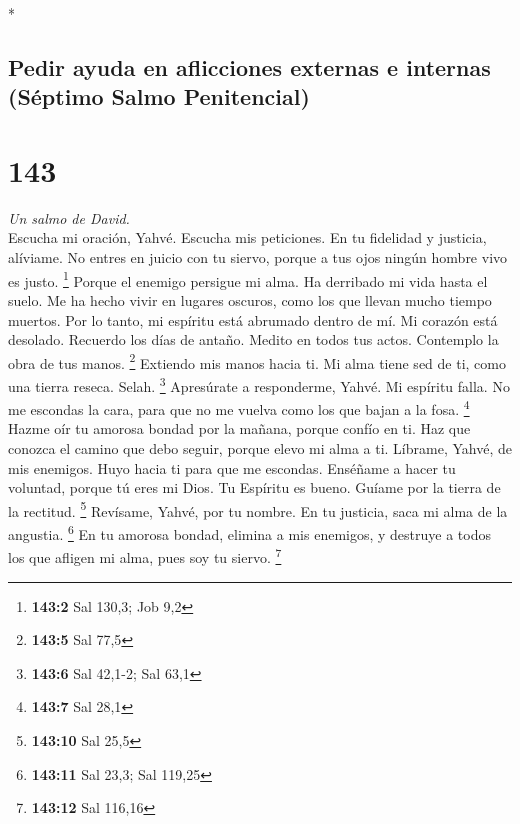 \begin{paracol}{2}
\begin{otherlanguage}{english}
\end{otherlanguage}

\switchcolumn[0]*

\hypertarget{pedir-ayuda-en-aflicciones-externas-e-internas-suxe9ptimo-salmo-penitencial}{%
\subsection{Pedir ayuda en aflicciones externas e internas (Séptimo
Salmo
Penitencial)}\label{pedir-ayuda-en-aflicciones-externas-e-internas-suxe9ptimo-salmo-penitencial}}

\hypertarget{section-284}{%
\section{143}\label{section-284}}

\emph{Un salmo de David.}\\
 Escucha mi oración, Yahvé. Escucha mis peticiones. En tu
fidelidad y justicia, alíviame.  No entres en juicio con
tu siervo, porque a tus ojos ningún hombre vivo es justo. \footnote{\textbf{143:2}
  Sal 130,3; Job 9,2}  Porque el enemigo persigue mi alma.
Ha derribado mi vida hasta el suelo. Me ha hecho vivir en lugares
oscuros, como los que llevan mucho tiempo muertos.  Por lo
tanto, mi espíritu está abrumado dentro de mí. Mi corazón está desolado.
 Recuerdo los días de antaño. Medito en todos tus actos.
Contemplo la obra de tus manos. \footnote{\textbf{143:5} Sal 77,5}
 Extiendo mis manos hacia ti. Mi alma tiene sed de ti,
como una tierra reseca. Selah. \footnote{\textbf{143:6} Sal 42,1-2; Sal
  63,1}  Apresúrate a responderme, Yahvé. Mi espíritu
falla. No me escondas la cara, para que no me vuelva como los que bajan
a la fosa. \footnote{\textbf{143:7} Sal 28,1}  Hazme oír
tu amorosa bondad por la mañana, porque confío en ti. Haz que conozca el
camino que debo seguir, porque elevo mi alma a ti. 
Líbrame, Yahvé, de mis enemigos. Huyo hacia ti para que me escondas.
 Enséñame a hacer tu voluntad, porque tú eres mi Dios. Tu
Espíritu es bueno. Guíame por la tierra de la rectitud. \footnote{\textbf{143:10}
  Sal 25,5}  Revísame, Yahvé, por tu nombre. En tu
justicia, saca mi alma de la angustia. \footnote{\textbf{143:11} Sal
  23,3; Sal 119,25}  En tu amorosa bondad, elimina a mis
enemigos, y destruye a todos los que afligen mi alma, pues soy tu
siervo. \footnote{\textbf{143:12} Sal 116,16}


\end{paracol}
